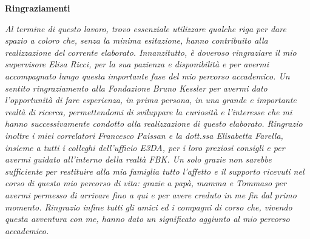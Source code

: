 
\thispagestyle{empty}

\begin{center}
\newpage
  {\bf \Huge Ringraziamenti}
\end{center}

\vspace{4cm}


\emph{
Al termine di questo lavoro, trovo essenziale utilizzare qualche riga per dare spazio a coloro che, senza la minima esitazione, hanno contribuito alla realizzazione del corrente elaborato.
Innanzitutto, è doveroso ringraziare il mio supervisore Elisa Ricci, per la sua pazienza e disponibilità e per avermi accompagnato lungo questa importante fase del mio percorso accademico.
Un sentito ringraziamento alla Fondazione Bruno Kessler per avermi dato l’opportunità di fare esperienza, in prima persona, in una grande e importante realtà di ricerca, permettendomi di sviluppare la curiosità e l’interesse che mi hanno successivamente condotto alla realizzazione di questo elaborato. Ringrazio inoltre i miei correlatori Francesco Paissan e la dott.ssa Elisabetta Farella, insieme a tutti i colleghi dell’ufficio E3DA, per i loro preziosi consigli e per avermi guidato all’interno della realtà FBK.
Un solo grazie non sarebbe sufficiente per restituire alla mia famiglia tutto l’affetto e il supporto ricevuti nel corso di questo mio percorso di vita: grazie a papà, mamma e Tommaso per avermi permesso di arrivare fino a qui e per avere creduto in me fin dal primo momento. 
Ringrazio infine tutti gli amici ed i compagni di corso che, vivendo questa avventura con me, hanno dato un significato aggiunto al mio percorso accademico.
}